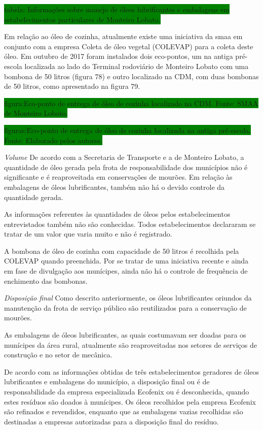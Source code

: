 \begin{description}
	\colorbox{green}{tabela: Informações sobre manejo de óleos lubrificantes e embalagens em estabelecimentos particulares de Monteiro Lobato.}
	
	Em relação ao óleo de cozinha, atualmente existe uma iniciativa da \gls{smaa} em conjunto com a empresa Coleta de óleo vegetal (COLEVAP) para a coleta deste óleo. Em outubro de 2017 foram instalados dois eco-pontos, um na antiga pré-escola localizada ao lado do Terminal rodoviário de Monteiro Lobato com uma bombona de 50 litros (figura 78) e outro localizado na CDM, com duas bombonas de 50 litros, como apresentado na figura 79.
	
	\colorbox{green}{figura:Eco-ponto de entrega de óleo de cozinha localizado na CDM. Fonte: SMAA de Monteiro Lobato.}
	
	\colorbox{green}{figuras:Eco-ponto de entrega de óleo de cozinha localizada na antiga pré-escola. Fonte: Elaborado pelos autores.}
	
	\subitem \textit{Volume} 
	De acordo com a Secretaria de Transporte e a  de Monteiro Lobato, a quantidade de óleo gerada pela frota de responsabilidade dos municípios não é significante e é reaproveitada em conservações de mourões. Em relação às embalagens de óleos lubrificantes, também não há o devido controle da quantidade gerada.
	
	As informações referentes às quantidades de óleos pelos estabelecimentos entrevistados também não são conhecidas. Todos estabelecimentos declararam se tratar de um valor que varia muito e não é registrado.
	
	A bombona de óleo de cozinha com capacidade de 50 litros é recolhida pela COLEVAP quando preenchida. Por se tratar de uma iniciativa recente e ainda em fase de divulgação aos munícipes, ainda não há o controle de frequência de enchimento das bombonas.
	
		\subitem \textit{Disposição final}
		Como descrito anteriormente, os óleos lubrificantes oriundos da manutenção da frota de serviço público são reutilizados para a conservação de mourões. 
	
	As embalagens de óleos lubrificantes, as quais costumavam ser doadas para os munícipes da área rural, atualmente são reaproveitadas nos setores de serviços de construção e no setor de mecânica.
	
	De acordo com as informações obtidas de três estabelecimentos geradores de óleos lubrificantes e embalagens do município, a disposição final ou é de responsabilidade da empresa especializada Ecofenix ou é desconhecida, quando estes resíduos são doados à munícipes. Os óleos recolhidos pela empresa Ecofenix são refinados e revendidos, enquanto que as embalagens vazias recolhidas são destinadas a empresas autorizadas para a disposição final do resíduo.
	

\end{description}
